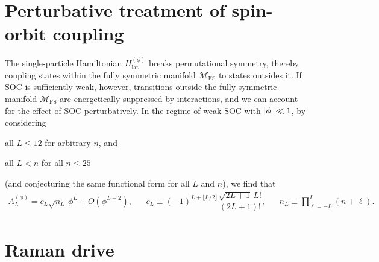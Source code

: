 \documentclass[nofootinbib,notitlepage,11pt]{revtex4-2}
\renewcommand{\t}{\text} %
\newcommand{\f}[2]{\dfrac{#1}{#2}} %
\newcommand{\p}[1]{\left(#1\right)} %
\newcommand{\1}{\mathds{1}}
\newcommand{\M}{\mathcal{M}}
\newcommand{\FS}{\text{FS}}
\begin{document}
\section{Perturbative treatment of spin-orbit coupling}
\label{sec:pert_SOC}

The single-particle Hamiltonian $H_{\t{lat}}^{(\phi)}$ breaks
permutational symmetry, thereby coupling states within the fully
symmetric manifold $\M_\FS$ to states outsides it.  If SOC is
sufficiently weak, however, transitions outside the fully symmetric
manifold $\M_\FS$ are energetically suppressed by interactions, and we
can account for the effect of SOC perturbatively.  In the regime of
weak SOC with $\abs{\phi}\ll1$, by considering
\begin{enumerate*}
\item all $L\le12$ for arbitrary $n$, and
\item all $L<n$ for all $n\le25$
\end{enumerate*}
(and conjecturing the same functional form for all $L$ and $n$), we
find that
\begin{align}
  A_L^{(\phi)} = c_L \sqrt{n_L}\, \phi^L + O\p{\phi^{L+2}},
  &&
  c_L \equiv \p{-1}^{L+\lfloor L/2\rfloor}
  \f{\sqrt{2L+1}\,L!}{\p{2L+1}!},
  &&
  n_L \equiv \prod_{\ell=-L}^L\p{n+\ell}.
  \label{eq:A_L_phi_small}
\end{align}


\vspace{3cm}


\section{Raman drive}
\label{sec:drive_raman}
\end{document}
